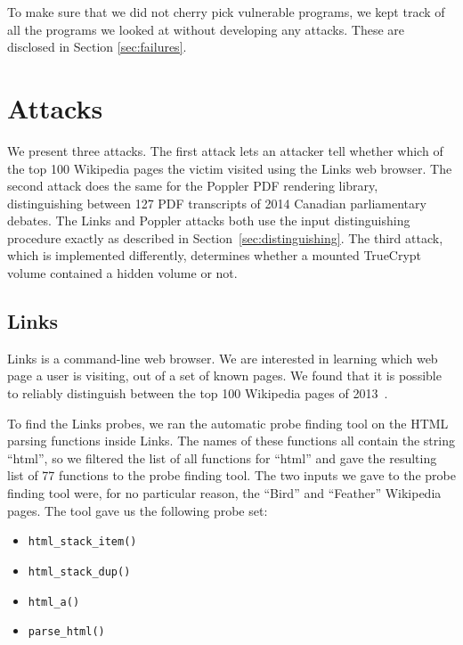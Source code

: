 \documentclass[letterpaper,twocolumn,10pt]{article}
\begin{document}
To make sure that we did not cherry pick vulnerable programs, we kept track of
all the programs we looked at without developing any attacks. These are
disclosed in Section \ref{sec:failures}.

\section{Attacks}
\label{sec:results}

We present three attacks. The first attack lets an attacker tell whether which
of the top 100 Wikipedia pages the victim visited using the Links web browser.
The second attack does the same for the Poppler PDF rendering library,
distinguishing between 127 PDF transcripts of 2014 Canadian parliamentary
debates. The Links and Poppler attacks both use the input distinguishing
procedure exactly as described in Section~\ref{sec:distinguishing}. The third
attack, which is implemented differently, determines whether a mounted TrueCrypt
volume contained a hidden volume or not.

\subsection{Links}

Links is a command-line web browser. We are interested in learning which web
page a user is visiting, out of a set of known pages. We found that it is
possible to reliably distinguish between the top 100 Wikipedia pages of
2013~\cite{wikitop2013}.

To find the Links probes, we ran the automatic probe finding tool on the HTML
parsing functions inside Links. The names of these functions all contain the
string ``html'', so we filtered the list of all functions for ``html'' and gave
the resulting list of 77 functions to the probe finding tool. The two inputs we
gave to the probe finding tool were, for no particular reason, the ``Bird'' and
``Feather'' Wikipedia pages. The tool gave us the following probe set:

\begin{itemize}
    \item \texttt{html\_stack\_item()}
    \item \texttt{html\_stack\_dup()}
    \item \texttt{html\_a()}
    \item \texttt{parse\_html()}
\end{itemize}

\end{document}
